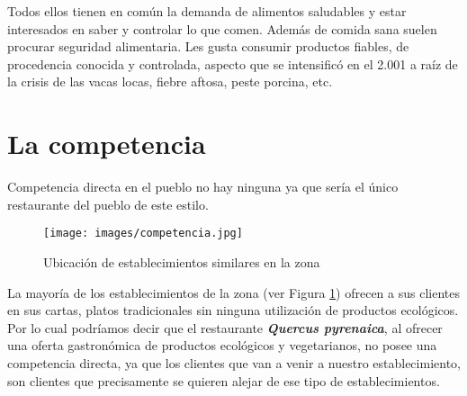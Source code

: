 Todos ellos tienen en común la demanda de alimentos saludables y estar interesados en saber y controlar lo que comen. Además de comida sana suelen procurar seguridad alimentaria. Les gusta consumir productos fiables, de procedencia conocida y controlada, aspecto que se intensificó en el 2.001 a raíz de la crisis de las vacas locas, fiebre aftosa, peste porcina, etc.

\section{La competencia}
\label{sec:competencia}

Competencia directa en el pueblo no hay ninguna ya que sería el único restaurante del pueblo de este estilo.
\begin{figure}[h]
  \begin{center}
    \texttt{[image: images/competencia.jpg]}
    \caption{Ubicación de establecimientos similares en la zona}
    \label{fig:competencia}
  \end{center}
\end{figure}

La mayoría de los establecimientos de la zona (ver Figura \ref{fig:competencia}) ofrecen a sus clientes en sus cartas, platos tradicionales sin ninguna utilización de productos ecológicos. Por lo cual podríamos decir que el restaurante \textbf{\textit{Quercus pyrenaica}}, al ofrecer una oferta gastronómica de productos ecológicos y vegetarianos, no posee una competencia directa, ya que los clientes que van a venir a nuestro establecimiento, son clientes que precisamente se quieren alejar de ese tipo de establecimientos.

